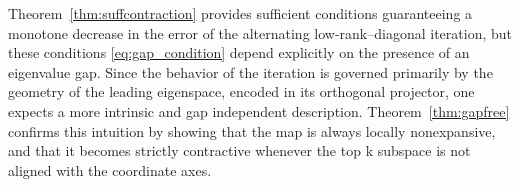 \documentclass[final,hidelinks,onefignum,onetabnum]{siamart250211}
\providecommand{\1}{\mathbf{1}}
\theoremstyle{plain}
\begin{document}



Theorem~\ref{thm:suffcontraction} provides sufficient conditions guaranteeing a monotone decrease in the error of the alternating low-rank–diagonal iteration, but these conditions \eqref{eq:gap_condition} depend explicitly on the presence of an eigenvalue gap.  Since
the behavior of the iteration is governed primarily by the geometry of the leading eigenspace,
encoded in its orthogonal projector, one expects a more intrinsic and gap independent description.
Theorem~\ref{thm:gapfree} confirms this intuition by showing that the map is always locally nonexpansive, and that
it becomes strictly contractive whenever the top k subspace is not aligned with the coordinate axes.
\end{document}
